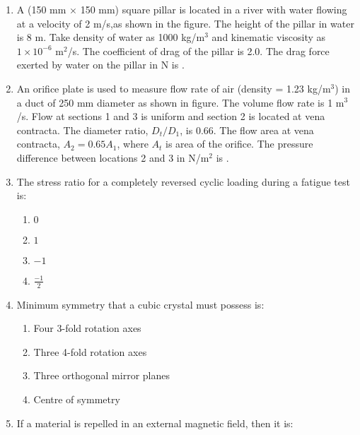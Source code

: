 \documentclass[journal,12pt,onecolumn]{IEEEtran}
\theoremstyle{remark}
\begin{document}
\begin{enumerate}
    \item A (150 mm $\times$ 150 mm) square pillar is located in a river with water flowing at a velocity of 2 m/s,as shown in the figure. The height of the pillar in water is 8 m. Take density of water as 1000 kg/m$^3$ and kinematic viscosity as $1 \times 10^{-6}$ m$^2$/s. The coefficient of drag of the pillar is 2.0. The drag force exerted by water on the pillar in N is {\underline{\hspace{2cm}}}.
    \begin{figure}[H]
        \centering
          
    \end{figure}
    \item An orifice plate is used to measure flow rate of air (density = 1.23 kg/m$^3$) in a duct of 250 mm diameter as shown in figure. The volume flow rate is 1 m$^3$/s. Flow at sections 1 and 3 is uniform and section 2 is located at vena contracta. The diameter ratio, $D_t/D_1$, is 0.66. The flow area at vena contracta, $A_2 = 0.65 A_1$, where $A_t$ is area of the orifice. The pressure difference between locations 2 and 3 in N/m$^2$ is {\underline{\hspace{2cm}}}.
    \begin{figure}[H]
        \centering
         
    \end{figure}
    \item The stress ratio for a completely reversed cyclic loading during a fatigue test is:
        \begin{multicols}{4}
    \begin{enumerate}
        \item $0$
        \item $1$
        \item $-1$
        \item $\frac{-1}{2}$
    \end{enumerate}
    \end{multicols}
    \item Minimum symmetry that a cubic crystal must possess is:
    \begin{enumerate}
        \item Four 3-fold rotation axes
        \item Three 4-fold rotation axes
        \item Three orthogonal mirror planes
        \item Centre of symmetry
    \end{enumerate}
    \item If a material is repelled in an external magnetic field, then it is:

\end{enumerate}
\end{document}
